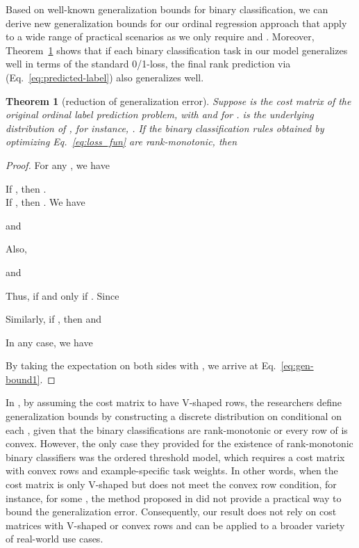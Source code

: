 \documentclass[times,twocolumn,final,authoryear]{elsarticle}
\newtheorem{theorem}{Theorem}
\begin{document}
Based on well-known generalization bounds for binary classification, we can derive new generalization bounds for our ordinal regression approach that apply to a wide range of practical scenarios as we only require  and  . Moreover, Theorem~\ref{th:gener-error} shows that if each binary classification task in our model generalizes well in terms of the standard 0/1-loss, the final rank prediction via  (Eq.~\ref{eq:predicted-label}) also generalizes well.
\begin{theorem}[reduction of generalization error]\label{th:gener-error}
Suppose  is the cost matrix of the original ordinal label prediction problem, with  and  for .  is the underlying distribution of , for instance, .  If the binary classification rules  obtained by optimizing Eq.~\ref{eq:loss_fun} are rank-monotonic, then



\end{theorem}
\begin{proof}
For any , we have


\noindent If , then .\\
If , then . We have 

\noindent and 

\noindent Also, 

and 

Thus,  if and only if . Since 



Similarly, if , then  and

In any case, we have 

By taking the expectation on both sides with , we arrive at Eq.~\eqref{eq:gen-bound1}.
\end{proof}

 In \cite{li2007ordinal}, by assuming the cost matrix to have V-shaped rows, the researchers define generalization bounds by constructing a discrete distribution on  conditional on each , given that the binary classifications are rank-monotonic or every row of  is convex. However, the only case they provided for the existence of rank-monotonic binary classifiers was the ordered threshold model, which requires a cost matrix with convex rows and example-specific task weights. In other words, when the cost matrix is only V-shaped but does not meet the convex row condition, for instance,  for some , the method proposed in \cite{li2007ordinal} did not provide a practical way to bound the generalization error. 
Consequently, our result does not rely on cost matrices with V-shaped or convex rows and can be applied to a broader variety of real-world use cases.
\end{document}
